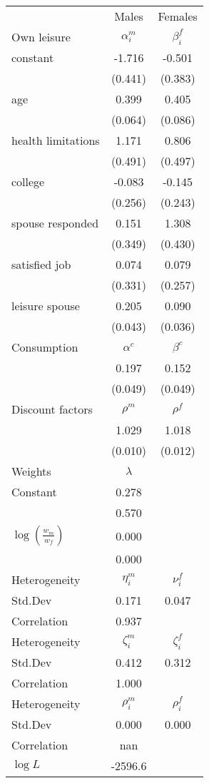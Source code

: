 \begin{tabular}{lcc} 
\hline\hline 
 & Males & Females \\ 
Own leisure & $\alpha_{i}^{m}$ & $\beta_{i}^{f}$ \\ 
constant & -1.716 & -0.501 \\ 
 & (0.441) & (0.383) \\ 
age & 0.399 & 0.405 \\ 
 & (0.064) & (0.086) \\ 
health limitations & 1.171 & 0.806 \\ 
 & (0.491) & (0.497) \\ 
college & -0.083 & -0.145 \\ 
 & (0.256) & (0.243) \\ 
spouse responded & 0.151 & 1.308 \\ 
 & (0.349) & (0.430) \\ 
satisfied job & 0.074 & 0.079 \\ 
 & (0.331) & (0.257) \\ 
leisure spouse & 0.205 & 0.090 \\ 
 & (0.043) & (0.036) \\ 
Consumption & $\alpha^{c}$ & $\beta^{c}$ \\ 
 & 0.197 & 0.152 \\ 
 & (0.049) & (0.049) \\ 
Discount factors & $\rho^m$ & $\rho^f$ \\ 
 & 1.029 & 1.018 \\ 
 & (0.010) & (0.012) \\ 
Weights & $\lambda$ &  \\ 
Constant & 0.278 &  \\ 
 & 0.570 &  \\ 
$\log(\frac{w_m}{w_f})$ & 0.000 &  \\ 
 & 0.000 &  \\ 
Heterogeneity & $\eta_i^m$ & $\nu_i^f$ \\ 
Std.Dev & 0.171 & 0.047 \\ 
Correlation & 0.937 &  \\ 
Heterogeneity & $\zeta_i^m$ & $\zeta_i^f$ \\ 
Std.Dev & 0.412 & 0.312 \\ 
Correlation & 1.000 &  \\ 
Heterogeneity & $\rho_i^m$ & $\rho_i^f$ \\ 
Std.Dev & 0.000 & 0.000 \\ 
Correlation & nan &  \\ 
\hline 
$\log L$ & -2596.6 & \\ 
\hline \hline 
\end{tabular} 

